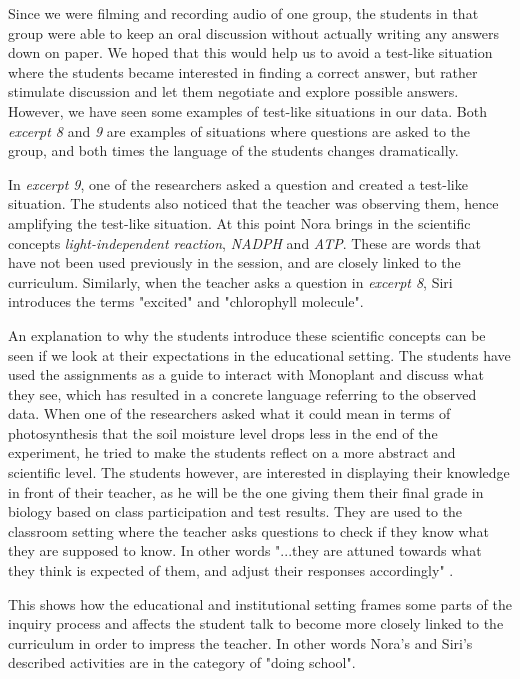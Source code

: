 Since we were filming and recording audio of one group, the students in that group were able to keep an oral discussion without actually writing any answers down on paper. We hoped that this would help us to avoid a test-like situation where the students became interested in finding a correct answer, but rather stimulate discussion and let them negotiate and explore possible answers. However, we have seen some examples of test-like situations in our data. Both \emph{excerpt 8} and \emph{9} are examples of situations where questions are asked to the group, and both times the language of the students changes dramatically. 

In \emph{excerpt 9}, one of the researchers asked a question and created a test-like situation. The students also noticed that the teacher was observing them, hence amplifying the test-like situation. At this point Nora brings in the scientific concepts \emph{light-independent reaction}, \emph{NADPH} and \emph{ATP}. These are words that have not been used previously in the session, and are closely linked to the curriculum. Similarly, when the teacher asks a question in \emph{excerpt 8}, Siri introduces the terms "excited" and "chlorophyll molecule".

An explanation to why the students introduce these scientific concepts can be seen if we look at their expectations in the educational setting. The students have used the assignments as a guide to interact with Monoplant and discuss what they see, which has resulted in a concrete language referring to the observed data. When one of the researchers asked what it could mean in terms of photosynthesis that the soil moisture level drops less in the end of the experiment, he tried to make the students reflect on a more abstract and scientific level. The students however, are interested in displaying their knowledge in front of their teacher, as he will be the one giving them their final grade in biology based on class participation and test results. They are used to the classroom setting where the teacher asks questions to check if they know what they are supposed to know. In other words "...they are attuned towards what they think is expected of them, and adjust their responses accordingly" \citep[p. 407]{furberg2009socio}. 

This shows how the educational and institutional setting frames some parts of the inquiry process and affects the student talk to become more closely linked to the curriculum in order to impress the teacher. In other words Nora's and Siri's described activities are in the category of "doing school".


